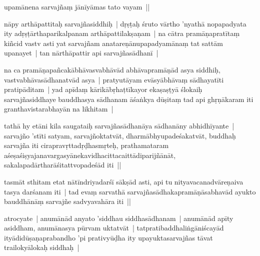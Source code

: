 \documentclass[article,12pt,a4paper]{memoir}%
\newcounter{parCount}
\begin{document}
	  
	  \pstart \leavevmode%
	upamānena sarvajñaṃ jānīyāmas tato vayam || 
	{}
	\pend%
      

	  
	  \pstart \leavevmode%
	\label{thakur75-30.24}nāpy arthāpattitaḥ sarvajñasiddhiḥ | dṛṣṭaḥ śruto vārtho 'nyathā nopapadyata ity adṛṣṭārthaparikalpanam arthāpattilakṣaṇam | na cātra pramāṇapratītaṃ kiñcid vastv asti yat sarvajñam anatareṇānupapadyamānaṃ tat sattām upanayet | tan nārthāpattir api sarvajñasādhanī | 
	{}
	\pend%
      

	  
	  \pstart \leavevmode%
	\label{thakur75-30.27}na ca pramāṇapañcakābhāvasvabhāvād abhāvapramāṇād asya siddhiḥ, vastvabhāvasādha\leavevmode{}\label{RNAms_17a}natvād asya | pratyutāyam evāsyābhāvaṃ sādhayatīti pratipāditam | yad apīdaṃ kārikābṛhaṭtīkayor ekaṣaṣṭyā ślokaiḥ sarvajñasiddhaye bauddhasya sādhanam āśaṅkya dūṣitaṃ tad api ghṛṇākaram iti granthavistarabhayān na likhitam |
	{}
	\pend%
      

	  
	  \pstart \leavevmode%
	\label{thakur75-31.1}tathā hy etāni kila saugataiḥ sarvajñasādhanāya sādhanāny abhidhīyante | sarvajño 'stīti satyam, sarvajñoktatvāt, dharmābhyupadeśakatvāt, buddhaḥ sarvajña iti cirapravṛttadṛḍhasmṛteḥ, prathamataram aśeṣaśiṣyajanavargasyānekavidhacittacaittādiparijñānāt, sakalapadārtharāśitattvopadeśād iti || 
	{}
	\pend%
      

	  
	  \pstart \leavevmode%
	\label{thakur75-31.6}tasmāt sthitam etat nātīndriyadarśī sākṣād asti, api tu nityavacanadvāreṇaiva tasya darśanam iti | tad evaṃ sarvathā sarvajñasādhakapramāṇāsabhavād ayukto bauddhānāṃ sarvajñe sadvyavahāra iti || 
	{}
	\pend%
      

	  
	  \pstart \leavevmode%
	\label{thakur75-31.9}atrocyate | anumānād anyato 'siddhau siddhasādhanam | anumānād apīty asiddham, anumānasya pūrvam uktatvāt | tatpratibaddhaliṅgāniścayād ityādidūṣaṇaprabandho 'pi prativyūḍha ity upayuktasarvajñas tāvat trailokyālokaḥ siddhaḥ | 
	{}
	\pend%
      
\end{document}
